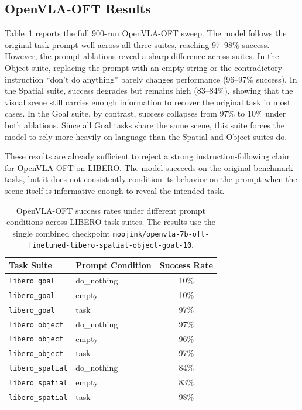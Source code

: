 \documentclass{article}
\begin{document}
\subsection{OpenVLA-OFT Results}

Table~\ref{tab:prompt_success_rate} reports the full 900-run OpenVLA-OFT sweep. The model follows the original task prompt well across all three suites, reaching 97--98\% success. However, the prompt ablations reveal a sharp difference across suites. In the Object suite, replacing the prompt with an empty string or the contradictory instruction ``don't do anything'' barely changes performance (96--97\% success). In the Spatial suite, success degrades but remains high (83--84\%), showing that the visual scene still carries enough information to recover the original task in most cases. In the Goal suite, by contrast, success collapses from 97\% to 10\% under both ablations. Since all Goal tasks share the same scene, this suite forces the model to rely more heavily on language than the Spatial and Object suites do.

These results are already sufficient to reject a strong instruction-following claim for OpenVLA-OFT on LIBERO. The model succeeds on the original benchmark tasks, but it does not consistently condition its behavior on the prompt when the scene itself is informative enough to reveal the intended task.

\begin{table}[t]
\centering
\caption{OpenVLA-OFT success rates under different prompt conditions across LIBERO task suites. The results use the single combined checkpoint \texttt{moojink/openvla-7b-oft-finetuned-libero-spatial-object-goal-10}.}
\label{tab:prompt_success_rate}
\begin{tabular}{l l c}
\toprule
\textbf{Task Suite} & \textbf{Prompt Condition} & \textbf{Success Rate} \\
\midrule
\texttt{libero\_goal}   & do\_nothing & 10\% \\
\texttt{libero\_goal}   & empty       & 10\% \\
\texttt{libero\_goal}   & task        & 97\% \\
\texttt{libero\_object} & do\_nothing & 97\% \\
\texttt{libero\_object} & empty       & 96\% \\
\texttt{libero\_object} & task        & 97\% \\
\texttt{libero\_spatial}& do\_nothing & 84\% \\
\texttt{libero\_spatial}& empty       & 83\% \\
\texttt{libero\_spatial}& task        & 98\% \\
\bottomrule
\end{tabular}
\end{table}
\end{document}
